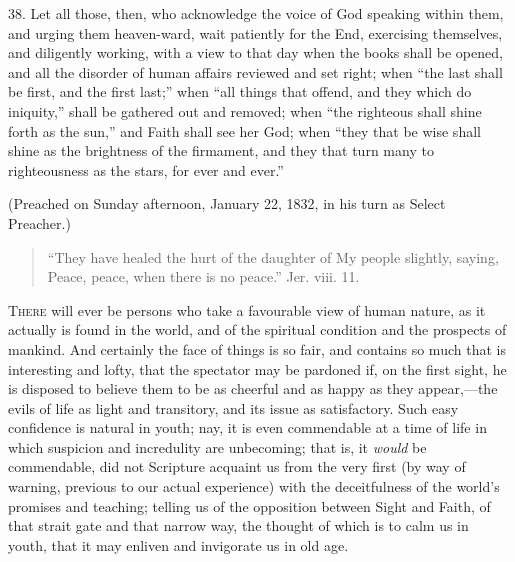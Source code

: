 38. Let all those, then, who acknowledge the voice of God speaking
within them, and urging them heaven-ward, wait patiently for the End,
exercising themselves, and diligently working, with a view to that day
when the books shall be opened, and all the disorder of human affairs
reviewed and set right; when ``the last shall be first, and the
first last;'' when ``all things that offend, and they which do
iniquity,'' shall be gathered out and removed; when ``the
righteous shall shine forth as the sun,'' and Faith shall see her
God; when ``they that be wise shall shine as the brightness of the
firmament, and they that turn many to righteousness as the stars, for
ever and ever.''

(Preached on Sunday afternoon, January 22, 1832, in his turn as
Select Preacher.)


\begin{quote}

``They have healed the hurt of the daughter of My people
slightly, saying, Peace, peace, when there is no peace.'' Jer.
viii. 11.

\end{quote}

T\textsc{here} will ever be persons who take a favourable view of human
nature, as it actually is found in the world, and of the spiritual
condition and the prospects of mankind. And certainly the face of
things is so fair, and contains so much that is interesting and lofty,
that the spectator may be pardoned if, on the first sight, he is
disposed to believe them to be as cheerful and as happy as they
appear,—the evils of life as light and transitory, and its issue as
satisfactory. Such easy confidence is natural in youth; nay, it is
even commendable at a time of life in which suspicion and incredulity
are unbecoming; that is, it \emph{would} be commendable, did not
Scripture acquaint us from the very first (by way of warning, previous
to our actual experience) with the deceitfulness of the world's
promises and teaching; telling us of the opposition between Sight and
Faith, of that strait gate and that narrow way, the thought of which
is to calm us in youth, that it may enliven and invigorate us in old
age.

